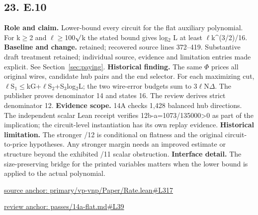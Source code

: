 \documentclass[11pt,letterpaper]{article}
\theoremstyle{definition}\newtheorem{definition}[theorem]{Definition}\newtheorem{example}[theorem]{Example}
\theoremstyle{remark}\newtheorem{remark}[theorem]{Remark}
\begin{document}
\subsection*{23. E.10}
\textbf{Role and claim.} Lower-bound every circuit for the flat auxiliary polynomial. For k\ensuremath{\ge}2 and \ensuremath{\ell}\ensuremath{\ge}100\ensuremath{\sqrt{\vphantom{x}}}k the stated bound gives log\ensuremath{{}_2} L at least \ensuremath{\ell}k\textasciicircum{}(3/2)/16.
\textbf{Baseline and change.} retained; recovered source lines 372--419. Substantive draft treatment retained; individual source, evidence and limitation entries made explicit. See Section~\ref{sec:paying}.
\textbf{Historical finding.} The same \ensuremath{\Phi} prices all original wires, candidate hub pairs and the end selector. For each maximizing cut, \ensuremath{\ell}S\ensuremath{{}_1}\ensuremath{\le}kG+\ensuremath{\ell}S\ensuremath{{}_2}+S\ensuremath{{}_3}log\ensuremath{{}_2}L; the two wire-error budgets sum to 3\ensuremath{\ell}N\ensuremath{\Delta}. The publisher proves denominator 14 and states 16. The review derives strict denominator 12.
\textbf{Evidence scope.} 14A checks 1,428 balanced hub directions. The independent scalar Lean receipt verifies 12b-a=1073/135000>0 as part of the implication; the circuit-level instantiation has its own replay evidence.
\textbf{Historical limitation.} The stronger /12 is conditional on flatness and the original circuit-to-price hypotheses. Any stronger margin needs an improved estimate or structure beyond the exhibited /11 scalar obstruction.
\textbf{Interface detail.} The size-preserving bridge for the printed variables matters when the lower bound is applied to the actual polynomial.
\par\href{https://github.com/nousentllc/VP-VNP-Review/blob/8a7976933b6b2b4ffda1ad3a0dfb5fc6b6f023e8/primary/vp-vnp/Paper/Rate.lean\#L317}{source anchor: primary/vp-vnp/Paper/Rate.lean\#L317}
\par\href{https://github.com/nousentllc/VP-VNP-Review/blob/8a7976933b6b2b4ffda1ad3a0dfb5fc6b6f023e8/passes/14a-flat.md\#L39}{review anchor: passes/14a-flat.md\#L39}
\goodbreak
\end{document}
